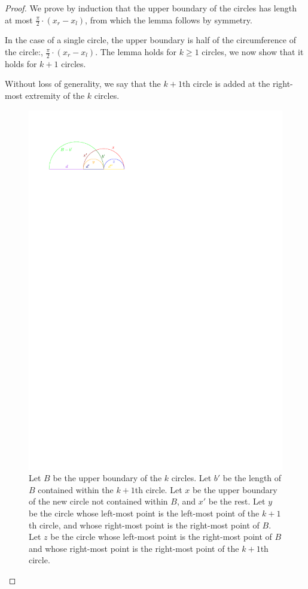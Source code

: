 \documentclass{tufte-handout}
\begin{document}
\begin{proof}

  We prove by induction that the upper boundary of the circles has
  length at most $\frac{\pi}{2} \cdot ( x_r - x_l )$, from which the
  lemma follows by symmetry.
  
  In the case of a single circle, the upper boundary is half of the
  circumference of the circle:, $\frac{\pi}{2} \cdot ( x_r - x_l )$.
  The lemma holds for $k \ge 1$ circles, we now show that it holds for
  $k+1$ circles.

  Without loss of generality, we say that the $k+1$th circle is added
  at the right-most extremity of the $k$ circles.  

\begin{figure}
  \includegraphics[scale=2.6]{figures/circle_unions.pdf}
  \caption{Let $B$ be the upper boundary of the $k$ circles.  Let $b'$
    be the length of $B$ contained within the $k+1$th circle.  Let $x$
    be the upper boundary of the new circle not contained within $B$,
    and $x'$ be the rest.  Let $y$ be the circle whose left-most point
    is the left-most point of the $k+1$th circle, and whose right-most
    point is the right-most point of $B$.  Let $z$ be the circle whose
    left-most point is the right-most point of $B$ and whose
    right-most point is the right-most point of the $k+1$th circle.}
\end{figure}


\end{proof}
\end{document}
